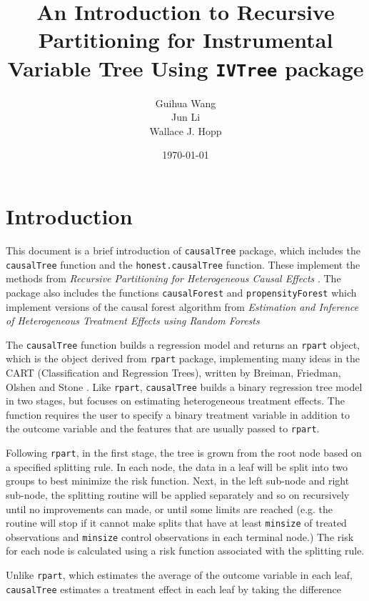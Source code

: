 \documentclass[11pt]{article}
\title {An Introduction to Recursive Partitioning for Instrumental Variable Tree Using \texttt{IVTree} package}
\author{Guihua Wang\\
Jun Li\\
Wallace J. Hopp}
\date{\today}
\begin{document}
% 
\maketitle
\tableofcontents

\section{Introduction}

\color{blue}
This document is a brief introduction of \texttt{causalTree} package, which includes the \texttt{causalTree} function and the \texttt{honest.causalTree} function.  These implement the methods from \textit{Recursive Partitioning for Heterogeneous Causal Effects} \cite{athey2015machine}. The package also includes the functions \texttt{causalForest} and \texttt{propensityForest} which implement versions of the causal forest algorithm from \textit{Estimation and Inference of Heterogeneous Treatment Effects using Random Forests} \cite{wager2015forest} \par
The \texttt{causalTree} function builds a regression model and returns an \texttt{rpart} object, which is the object derived from \texttt{rpart} package, implementing many ideas in the CART (Classification and Regression Trees), written by Breiman, Friedman, Olshen and Stone \cite{Breiman83}. Like \texttt{rpart}, \texttt{causalTree} builds a binary regression tree model in two stages, but focuses on estimating heterogeneous treatment effects.  The function requires the user to specify a binary treatment variable in addition to the outcome variable and the
features that are usually passed to \texttt{rpart}.\par
Following \texttt{rpart}, in the first stage, the tree is grown from the root node based on a specified splitting rule. In each node, the data in a leaf will be split into two groups to best minimize the risk function. Next, in the left sub-node and right sub-node, the splitting routine will be applied separately and so on recursively until no improvements can made, or until some limits are reached (e.g. the routine will stop if it cannot make splits that have at least \texttt{minsize} of treated observations and \texttt{minsize} control observations in each terminal node.)
The risk for each node is calculated using a risk function associated with the splitting rule. \par
Unlike \texttt{rpart}, which estimates the average of the outcome variable in each leaf, \texttt{causalTree} estimates a treatment effect in each leaf by taking the difference
\end{document}
